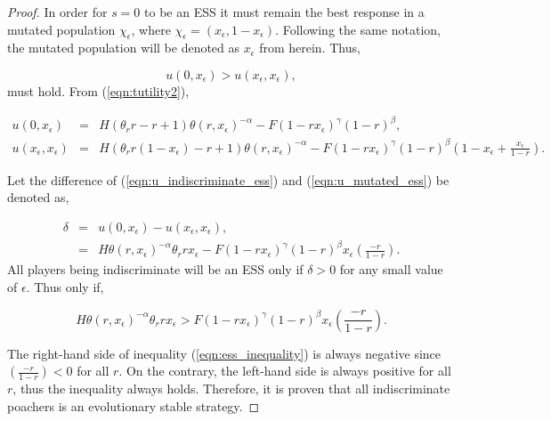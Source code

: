 \documentclass[10pt]{article}
\begin{document}
\begin{proof}
    In order for \(s=0\) to be an ESS it must
    remain the best response in a mutated population \(\chi_\epsilon\),
    where \(\chi_{\epsilon}=(x_\epsilon, 1 - x_\epsilon)\). Following the same
    notation, the mutated population will be denoted as \(x_\epsilon\) from
    herein. Thus,

    \begin{equation}\label{eqn:evolutionary_stability}
        u(0, x_\epsilon) > u(x_\epsilon, x_\epsilon),
    \end{equation}
    must hold. From (\ref{eqn:tutility2}),

    \begin{eqnarray}
        \label{eqn:u_indiscriminate_ess}
        u(0, x_\epsilon)  &=& H(\theta_rr - r + 1)\theta(r, x_\epsilon) ^{-\alpha}
        - F(1 - rx_\epsilon) ^ {\gamma} (1- r) ^ {\beta}, 
        \\
        \label{eqn:u_mutated_ess}
         u(x_\epsilon, x_\epsilon) &=& H(\theta_rr(1 - x_\epsilon)-r+ 1)\theta(r,
        x_\epsilon) ^{-\alpha} - F(1 - rx_\epsilon) ^ {\gamma} (1- r) ^
        {\beta}\left(1 - 
        x_\epsilon + \frac{x_\epsilon}{1- r}\right).
\end{eqnarray}

    \noindent Let the difference of (\ref{eqn:u_indiscriminate_ess}) and (\ref{eqn:u_mutated_ess})
    be denoted as,

    \begin{eqnarray}
        \label{eqn:delta}
        \delta &=& u(0, x_\epsilon) - u(x_\epsilon, x_\epsilon),
          \\
         &=& H\theta(r,  x_\epsilon) ^{-\alpha} \theta_r r x_\epsilon -
        F(1 - r x_\epsilon) ^ {\gamma} (1- r) ^
        {\beta}x_\epsilon\left(\frac{-r}{1- r}\right).
    \end{eqnarray}
    All players being indiscriminate will be an ESS only if \(\delta >0 \) for any small
    value of \(\epsilon\). Thus only if,

    \begin{equation}
    \label{eqn:ess_inequality}
        H\theta(r, x_\epsilon) ^{-\alpha} \theta_r r x_\epsilon > F
        (1 - r x_\epsilon) ^ {\gamma} (1- r) ^ {\beta}
        x_\epsilon\left(\frac{-r}{1- r}\right).
    \end{equation}

    \noindent The right-hand side of inequality (\ref{eqn:ess_inequality}) is always negative
    since \((\frac{-r}{1- r}) < 0\)  for all \(r\). On the contrary, the left-hand
    side is always positive for all \(r\), thus the inequality always holds.
    Therefore, it is proven that all indiscriminate poachers is an evolutionary
    stable strategy.
\end{proof}
\end{document}
